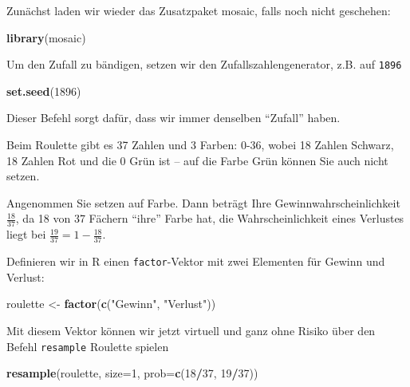 \documentclass[12pt,ngerman,paper=a4,pagesize,DIV=13]{scrreprt}
\newenvironment{Shaded}{\begin{snugshade}}{\end{snugshade}}
\newcommand{\DataTypeTok}[1]{\textcolor[rgb]{0.13,0.29,0.53}{#1}}
\newcommand{\DecValTok}[1]{\textcolor[rgb]{0.00,0.00,0.81}{#1}}
\newcommand{\KeywordTok}[1]{\textcolor[rgb]{0.13,0.29,0.53}{\textbf{#1}}}
\newcommand{\NormalTok}[1]{#1}
\newcommand{\OperatorTok}[1]{\textcolor[rgb]{0.81,0.36,0.00}{\textbf{#1}}}
\newcommand{\StringTok}[1]{\textcolor[rgb]{0.31,0.60,0.02}{#1}}
\begin{document}
Zunächst laden wir wieder das Zusatzpaket mosaic, falls noch nicht
geschehen:

\begin{Shaded}
\begin{Highlighting}[]
\KeywordTok{library}\NormalTok{(mosaic)}
\end{Highlighting}
\end{Shaded}

Um den Zufall zu bändigen, setzen wir den Zufallszahlengenerator, z.B.
auf \texttt{1896}

\begin{Shaded}
\begin{Highlighting}[]
\KeywordTok{set.seed}\NormalTok{(}\DecValTok{1896}\NormalTok{)}
\end{Highlighting}
\end{Shaded}

Dieser Befehl sorgt dafür, dass wir immer denselben \enquote{Zufall}
haben.

Beim Roulette gibt es 37 Zahlen und 3 Farben: 0-36, wobei 18 Zahlen
Schwarz, 18 Zahlen Rot und die 0 Grün ist -- auf die Farbe Grün können
Sie auch nicht setzen.

Angenommen Sie setzen auf Farbe. Dann beträgt Ihre
Gewinnwahrscheinlichkeit \(\frac{18}{37}\), da 18 von 37 Fächern
\enquote{ihre} Farbe hat, die Wahrscheinlichkeit eines Verlustes liegt
bei \(\frac{19}{37}=1-\frac{18}{37}\).

Definieren wir in R einen \texttt{factor}-Vektor mit zwei Elementen für
Gewinn und Verlust:

\begin{Shaded}
\begin{Highlighting}[]
\NormalTok{roulette <-}\StringTok{ }\KeywordTok{factor}\NormalTok{(}\KeywordTok{c}\NormalTok{(}\StringTok{"Gewinn"}\NormalTok{, }\StringTok{"Verlust"}\NormalTok{))}
\end{Highlighting}
\end{Shaded}

Mit diesem Vektor können wir jetzt virtuell und ganz ohne Risiko über
den Befehl \texttt{resample} Roulette spielen

\begin{Shaded}
\begin{Highlighting}[]
\KeywordTok{resample}\NormalTok{(roulette, }\DataTypeTok{size=}\DecValTok{1}\NormalTok{, }\DataTypeTok{prob=}\KeywordTok{c}\NormalTok{(}\DecValTok{18}\OperatorTok{/}\DecValTok{37}\NormalTok{, }\DecValTok{19}\OperatorTok{/}\DecValTok{37}\NormalTok{))}
\end{Highlighting}
\end{Shaded}
\end{document}
